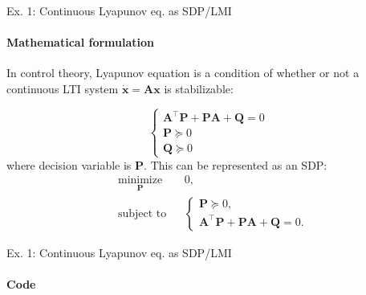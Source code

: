 \documentclass{beamer}
\begin{document}
\begin{frame}{Ex. 1: Continuous Lyapunov eq. as SDP/LMI}
\framesubtitle{Mathematical formulation}
\begin{flushleft}

In control theory, Lyapunov equation is a condition of whether or not a continuous LTI system $\dot{\mathbf{x}} = \mathbf{A}\mathbf{x}$ is stabilizable:

\begin{equation}
    \begin{cases}
        \mathbf{A}^\top\mathbf{P} + \mathbf{P}\mathbf{A} + \mathbf{Q} = 0 \\
        \mathbf{P} \succeq 0 \\
        \mathbf{Q} \succeq 0 
    \end{cases}
\end{equation}
%
where decision variable is $\mathbf{P}$. This can be represented as an SDP:
%
\begin{equation}
\begin{aligned}
& \underset{\mathbf{P}}{\text{minimize}}
& & 0, \\
& \text{subject to}
& & \begin{cases}
    \mathbf{P} \succeq 0, \\
    \mathbf{A}^\top\mathbf{P} + \mathbf{P}\mathbf{A} + \mathbf{Q} = 0.
    \end{cases}
\end{aligned}
\end{equation}


\end{flushleft}
\end{frame}




\begin{frame}{Ex. 1: Continuous Lyapunov eq. as SDP/LMI}
\framesubtitle{Code}
\begin{flushleft}



\end{flushleft}
\end{frame}
\end{document}
